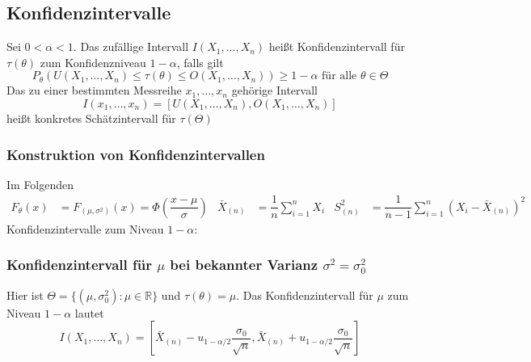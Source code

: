 \documentclass[
	ngerman,
	accentcolor=9c,%
	type=intern,
	marginpar=false
	]{tudapub}
\begin{document}
        \subsection{Konfidenzintervalle}
            \begin{definition}
                Sei $0 < \alpha < 1$. Das zufällige Intervall $I(X_1, \dots, X_n)$ heißt Konfidenzintervall für $\tau(\theta)$ zum Konfidenzniveau $1-\alpha$, falls gilt 
                \begin{equation*}
                    P_\theta(U(X_1,\dots,X_n)\leq \tau(\theta) \leq O(X_1,\dots,X_n)) \geq 1-\alpha \text{ für alle } \theta \in \Theta
                \end{equation*}
                Das zu einer bestimmten Messreihe $x_1,\dots,x_n$ gehörige Intervall
                \begin{equation*}
                    I(x_1,\dots,x_n) = [U(X_1,\dots,X_n),O(X_1,\dots,X_n)]
                \end{equation*}
                heißt konkretes Schätzintervall für $\tau(\Theta)$
            \end{definition}
            \subsubsection{Konstruktion von Konfidenzintervallen}
                Im Folgenden
                \begin{align*}
                    F_\theta(x) &= F_{(\mu, \sigma^2)}(x)= \Phi(\dfrac{x-\mu}{\sigma}) &
                    \bar{X}_{(n)}&=\dfrac{1}{n}\sum_{i=1}^n X_i &
                    S^2_{(n)} &= \dfrac{1}{n-1}\sum_{i=1}^n (X_i - \bar{X}_{(n)})^2
                \end{align*}
                Konfidenzintervalle zum Niveau $1-\alpha$:
                \subsubsection*{Konfidenzintervall für $\mu$ bei bekannter Varianz $\sigma^2 = \sigma_0^2$}
                    Hier ist $\Theta = \{(\mu, \sigma^2_0):\mu \in \mathbb{R}\}$ und $\tau(\theta) = \mu$. Das Konfidenzintervall für $\mu$ zum Niveau $1-\alpha$ lautet
                    \begin{equation*}
                        I(X_1,\dots,X_n)=\left[\bar{X}_{(n)}-u_{1-\alpha/2}\dfrac{\sigma_0}{\sqrt{n}},\bar{X}_{(n)}+u_{1-\alpha/2}\dfrac{\sigma_0}{\sqrt{n}}\right]
                    \end{equation*}
\end{document}
